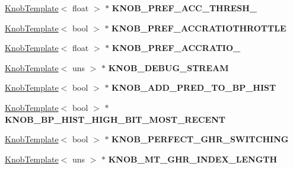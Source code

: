 \begin{DoxyCompactItemize}
\item 
\hypertarget{classall__knobs__c_a967859e5459c9005166c3c0cfa786db4}{
\hyperlink{classKnobTemplate}{KnobTemplate}$<$ float $>$ $\ast$ {\bfseries KNOB\_\-PREF\_\-ACC\_\-THRESH\_}}
\label{classall__knobs__c_a967859e5459c9005166c3c0cfa786db4}

\item 
\hypertarget{classall__knobs__c_a782592902d03fe898b216f4c31929913}{
\hyperlink{classKnobTemplate}{KnobTemplate}$<$ bool $>$ $\ast$ {\bfseries KNOB\_\-PREF\_\-ACCRATIOTHROTTLE}}
\label{classall__knobs__c_a782592902d03fe898b216f4c31929913}

\item 
\hypertarget{classall__knobs__c_a18e41c68f52484ac9fe9a0019c2acd35}{
\hyperlink{classKnobTemplate}{KnobTemplate}$<$ float $>$ $\ast$ {\bfseries KNOB\_\-PREF\_\-ACCRATIO\_}}
\label{classall__knobs__c_a18e41c68f52484ac9fe9a0019c2acd35}

\item 
\hypertarget{classall__knobs__c_a1f2f1383e693dc14f9c29b7ee072cfc9}{
\hyperlink{classKnobTemplate}{KnobTemplate}$<$ uns $>$ $\ast$ {\bfseries KNOB\_\-DEBUG\_\-STREAM}}
\label{classall__knobs__c_a1f2f1383e693dc14f9c29b7ee072cfc9}

\item 
\hypertarget{classall__knobs__c_a874b5460d5b6dd27adc289a97644e8b5}{
\hyperlink{classKnobTemplate}{KnobTemplate}$<$ bool $>$ $\ast$ {\bfseries KNOB\_\-ADD\_\-PRED\_\-TO\_\-BP\_\-HIST}}
\label{classall__knobs__c_a874b5460d5b6dd27adc289a97644e8b5}

\item 
\hypertarget{classall__knobs__c_a17616e1c01f05806129eeed564ed60b4}{
\hyperlink{classKnobTemplate}{KnobTemplate}$<$ bool $>$ $\ast$ {\bfseries KNOB\_\-BP\_\-HIST\_\-HIGH\_\-BIT\_\-MOST\_\-RECENT}}
\label{classall__knobs__c_a17616e1c01f05806129eeed564ed60b4}

\item 
\hypertarget{classall__knobs__c_a636fa4c9c7a29ac1857f30a4d4f46858}{
\hyperlink{classKnobTemplate}{KnobTemplate}$<$ bool $>$ $\ast$ {\bfseries KNOB\_\-PERFECT\_\-GHR\_\-SWITCHING}}
\label{classall__knobs__c_a636fa4c9c7a29ac1857f30a4d4f46858}

\item 
\hypertarget{classall__knobs__c_a40e68b8129a71d567f146b446e270548}{
\hyperlink{classKnobTemplate}{KnobTemplate}$<$ uns $>$ $\ast$ {\bfseries KNOB\_\-MT\_\-GHR\_\-INDEX\_\-LENGTH}}
\label{classall__knobs__c_a40e68b8129a71d567f146b446e270548}


\end{DoxyCompactItemize}
